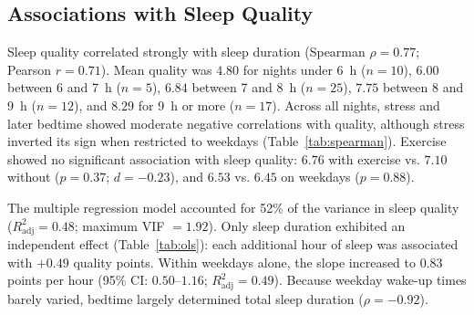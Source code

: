 \documentclass[conference]{IEEEtran}
\begin{document}
\subsection{Associations with Sleep Quality}
Sleep quality correlated strongly with sleep duration (Spearman $\rho=0.77$; Pearson $r=0.71$). Mean quality was $4.80$ for nights under 6~h ($n=10$), $6.00$ between 6 and 7~h ($n=5$), $6.84$ between 7 and 8~h ($n=25$), $7.75$ between 8 and 9~h ($n=12$), and $8.29$ for 9~h or more ($n=17$). Across all nights, stress and later bedtime showed moderate negative correlations with quality, although stress inverted its sign when restricted to weekdays (Table~\ref{tab:spearman}). Exercise showed no significant association with sleep quality: $6.76$ with exercise vs. $7.10$ without ($p=0.37$; $d=-0.23$), and $6.53$ vs. $6.45$ on weekdays ($p=0.88$).

The multiple regression model accounted for 52\% of the variance in sleep quality ($R_{\text{adj}}^2=0.48$; maximum VIF $= 1.92$). Only sleep duration exhibited an independent effect (Table~\ref{tab:ols}): each additional hour of sleep was associated with $+0.49$ quality points. Within weekdays alone, the slope increased to $0.83$ points per hour (95\% CI: $0.50$--$1.16$; $R_{\text{adj}}^2=0.49$). Because weekday wake-up times barely varied, bedtime largely determined total sleep duration ($\rho=-0.92$).

\begin{table}[h]
\centering
\caption{Spearman correlation with sleep quality [95\% bootstrap CI].}
\label{tab:spearman}
\end{table}
\end{document}
